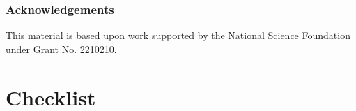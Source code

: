 \documentclass[twoside]{article}
\begin{document}

\subsubsection*{Acknowledgements}
This material is based upon work supported by the National Science Foundation under Grant No. 2210210.

















\section*{Checklist}
\end{document}

